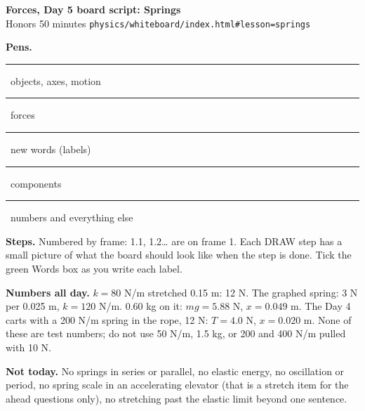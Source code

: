 \documentclass[10.5pt]{article}
\newcommand{\pen}[2]{\textcolor{#1}{\rule{8pt}{8pt}}\ #2}
\begin{document}
\begin{center}{\Large\bfseries Forces, Day 5 board script: Springs}\\[2pt]{\normalsize Honors \textbullet{} 50 minutes \textbullet{} \texttt{physics/whiteboard/index.html\#lesson=springs}}\end{center}
\noindent\textbf{Pens.} \pen{pblue}{objects, axes, motion} \quad \pen{pred}{forces} \quad \pen{pgreen}{new words (labels)} \quad \pen{ppurple}{components} \quad \pen{black}{numbers and everything else}\par
\noindent\textbf{Steps.} Numbered by frame: 1.1, 1.2\ldots{} are on frame 1. Each DRAW step has a small picture of what the board should look like when the step is done. Tick the green Words box as you write each label.\par
\noindent\textbf{Numbers all day.} $k = 80$ N/m stretched 0.15 m: 12 N. The graphed spring: 3 N per 0.025 m, $k = 120$ N/m. 0.60 kg on it: $mg = 5.88$ N, $x = 0.049$ m. The Day 4 carts with a 200 N/m spring in the rope, 12 N: $T = 4.0$ N, $x = 0.020$ m. None of these are test numbers; do not use 50 N/m, 1.5 kg, or 200 and 400 N/m pulled with 10 N.\par
\noindent\textbf{Not today.} No springs in series or parallel, no elastic energy, no oscillation or period, no spring scale in an accelerating elevator (that is a stretch item for the ahead questions only), no stretching past the elastic limit beyond one sentence.\par\smallskip
\noindent{}\par\medskip
\end{document}
